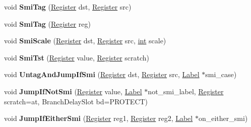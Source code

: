 \begin{DoxyCompactItemize}
void {\bfseries Smi\+Tag} (\mbox{\hyperlink{classv8_1_1internal_1_1Register}{Register}} dst, \mbox{\hyperlink{classv8_1_1internal_1_1Register}{Register}} src)
\item 
\mbox{\label{classv8_1_1internal_1_1MacroAssembler_acf7c9f888b258ba74498dd2ccbb15285}} 
void {\bfseries Smi\+Tag} (\mbox{\hyperlink{classv8_1_1internal_1_1Register}{Register}} reg)
\item 
\mbox{\label{classv8_1_1internal_1_1MacroAssembler_afee57ef74391815004560619e1680075}} 
void {\bfseries Smi\+Scale} (\mbox{\hyperlink{classv8_1_1internal_1_1Register}{Register}} dst, \mbox{\hyperlink{classv8_1_1internal_1_1Register}{Register}} src, \mbox{\hyperlink{classint}{int}} scale)
\item 
\mbox{\label{classv8_1_1internal_1_1MacroAssembler_aa952efe697275bc5c5f66760023f78ea}} 
void {\bfseries Smi\+Tst} (\mbox{\hyperlink{classv8_1_1internal_1_1Register}{Register}} value, \mbox{\hyperlink{classv8_1_1internal_1_1Register}{Register}} scratch)
\item 
\mbox{\label{classv8_1_1internal_1_1MacroAssembler_a9cb3d8cb77fca08c8db1fee15b8c192c}} 
void {\bfseries Untag\+And\+Jump\+If\+Smi} (\mbox{\hyperlink{classv8_1_1internal_1_1Register}{Register}} dst, \mbox{\hyperlink{classv8_1_1internal_1_1Register}{Register}} src, \mbox{\hyperlink{classv8_1_1internal_1_1Label}{Label}} $\ast$smi\+\_\+case)
\item 
\mbox{\label{classv8_1_1internal_1_1MacroAssembler_a611e534bb0c253fd10d03f7f3ac01ef5}} 
void {\bfseries Jump\+If\+Not\+Smi} (\mbox{\hyperlink{classv8_1_1internal_1_1Register}{Register}} value, \mbox{\hyperlink{classv8_1_1internal_1_1Label}{Label}} $\ast$not\+\_\+smi\+\_\+label, \mbox{\hyperlink{classv8_1_1internal_1_1Register}{Register}} scratch=at, Branch\+Delay\+Slot bd=P\+R\+O\+T\+E\+CT)
\item 
\mbox{\label{classv8_1_1internal_1_1MacroAssembler_a781acc0a777ee0a49f000f204797e3d0}} 
void {\bfseries Jump\+If\+Either\+Smi} (\mbox{\hyperlink{classv8_1_1internal_1_1Register}{Register}} reg1, \mbox{\hyperlink{classv8_1_1internal_1_1Register}{Register}} reg2, \mbox{\hyperlink{classv8_1_1internal_1_1Label}{Label}} $\ast$on\+\_\+either\+\_\+smi)

\end{DoxyCompactItemize}
